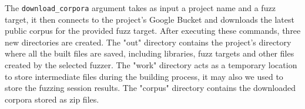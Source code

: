 \newline \newline
The \verb|download_corpora| argument takes as input a project name and a fuzz target, it then connects to the project's Google Bucket and downloads the latest public corpus for the provided fuzz target.
\newline \newline \newline
After executing these commands, three new directories are created.
\newline
The "out" directory contains the project's directory where all the built files are saved, including libraries, fuzz targets and other files created by the selected fuzzer.
\newline
The "work" directory acts as a temporary location to store intermediate files during the building process, it may also we used to store the fuzzing session results.
\newline
The "corpus" directory contains the downloaded corpora stored as zip files.



